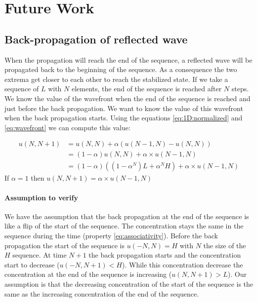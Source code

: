\chapter{Future Work}

\section{Back-propagation of reflected wave}

When the propagation will reach the end of the sequence, a reflected wave will be
propagated back to the beginning of the sequence. As a consequence the two extrema get 
closer to each other to reach the stabilized state. If we take a sequence of $L$ with
$N$ elements, the end of the sequence is reached after $N$ steps. We know the value
of the wavefront when the end of the sequence is reached and just before the back 
propagation. We want to know the value of this wavefront when the back propagation
starts. Using the equations \eqref{eq:1D:normalized} and \eqref{eq:wavefront}
we can compute this value:

\begin{equation}
    \begin{split}
        u(N,N+1) & = u(N,N) + \alpha \left( u(N-1,N) - u(N,N) \right) \\
                 & = (1 - \alpha)u(N,N) + \alpha \times u(N-1,N)\\
                 & = (1 - \alpha)((1-\alpha^N)L+\alpha^NH) + \alpha \times u(N-1,N)
    \end{split}
    \label{eq:backprop}
\end{equation}
%
If $\alpha=1$ then $u(N,N+1)=\alpha \times u(N-1,N)$

\subsubsection{Assumption to verify}

We have the assumption that the back propagation at the end of the sequence is
like a flip of the start of the sequence. The concentration stays the same in the
sequence during the time (property \eqref{eq:associativity}). Before the back propagation
the start of the sequence is $u(-N,N)=H$ with $N$ the size of the $H$ sequence. At time
$N+1$ the back propagation starts and the concentration start to decrease 
($u(-N,N+1)<H$). While this concentration decrease the concentration at the end of the
sequence is increasing ($u(N,N+1)>L$). Our assumption is that the decreasing concentration
of the start of the sequence is the same as the increasing concentration of the end of the
sequence.


